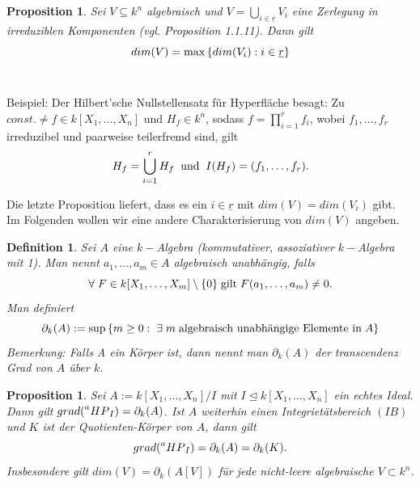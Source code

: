 \documentclass{article}
\newtheorem{definition}[satz]{Definition}
\newtheorem{proposition}[satz]{Proposition}
\newcommand*{\R}{k[X_{1},\ldots,X_{n}]}
\newcommand*{\indx}[2]{{#1}_{#2}}
\newcommand*{\hp}[1]{$\prescript{a}{}{HP}_{#1}$}
\begin{document}
\begin{proposition}
	Sei $V\subseteq k^n$ algebraisch und $V=\bigcup\limits_{i\in\underline{r}}\indx{V}{i}$ eine Zerlegung in irreduziblen Komponenten (vgl. Proposition 1.1.11). Dann gilt
	\begin{displaymath}
	dim(V)=\max{\{dim(\indx{V}{i}):i\in\underline{r}\}}\\
	\end{displaymath}
	\\
\end{proposition}
Beispiel:
Der Hilbert'sche Nullstellensatz für Hyperfläche besagt: Zu $const.\neq f\in \R$ und $\indx{H}{f}\in k^n$, sodass $f=\prod\limits_{i=1}^{r} \indx{f}{i}$, wobei $\indx{f}{1},\ldots,\indx{f}{r}$ irreduzibel und paarweise teilerfremd sind, gilt
\begin{displaymath}
\indx{H}{f}=\bigcup\limits_{i=1}^{r} \indx{H}{f}\;\; \textnormal{und}\;\;I(\indx{H}{f})=(\indx{f}{1},\ldots,\indx{f}{r}).
\end{displaymath}

Die letzte Proposition liefert, dass es ein $i\in \underline{r}$ mit $dim(V)=dim(\indx{V}{i})$ gibt.\\ 

Im Folgenden wollen wir eine andere Charakterisierung von $dim(V)$ angeben. 
\begin{definition}
	Sei $A$ eine $k-$Algebra (kommutativer, assoziativer $k-$Algebra mit 1). Man nennt $\indx{a}{1},\ldots,\indx{a}{m}\in A$ algebraisch unabhängig, falls 
	\begin{displaymath}
	\forall \;F\in k[\indx{X}{1},\ldots,\indx{X}{m}]\setminus\{0\} \;\textnormal{gilt}\; F(\indx{a}{1},\ldots,\indx{a}{m})\neq0.
	\end{displaymath}
	Man definiert
	\begin{displaymath}
	\indx{\partial}{k}(A):=\sup{\{m\geq0:\;\exists\; m \;\textnormal{algebraisch unabhängige Elemente in}\; A\}}
	\end{displaymath}
	Bemerkung: Falls A ein Körper ist, dann nennt man $\indx{\partial}{k}(A)$ der transcendenz Grad von $A$ über $k$.\\
\end{definition}

\begin{proposition}
	Sei $A:=\R/I$ mit $I\unlhd\R$ ein echtes Ideal. Dann gilt $grad(\textnormal{\hp{I}})=\indx{\partial}{k}(A)$. Ist $A$ weiterhin einen Integrietätsbereich $(IB)$ und $K$ ist der Quotienten-Körper von $A$, dann gilt
	\begin{displaymath}
	grad(\textnormal{\hp{I}})=\indx{\partial}{k}(A)=\indx{\partial}{k}(K).
	\end{displaymath}
	Insbesondere gilt $dim(V)=\indx{\partial}{k}(A[V])$ für jede nicht-leere algebraische $V\subset k^n$.\\
\end{proposition}
\end{document}
